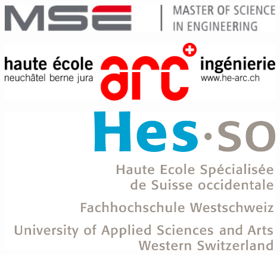 \begin{titlepage}
\fontsize{5cm}{10}%
\selectfont

\begin{flushright}
\begin{minipage}{0.33\textwidth}
\begin{flushleft}
\includegraphics[width=0.9\textwidth]{./images/logos/mse_logo.jpg}
\end{flushleft}
\vspace{1.3cm}
\end{minipage}
\begin{minipage}{0.33\textwidth}
\begin{center}
\includegraphics[width=0.9\textwidth]{./images/logos/he-arc-logo.png}
\end{center}
\vspace{1.3cm}
\end{minipage}%
\begin{minipage}{0.33\textwidth}
\begin{flushright}
\includegraphics[width=0.9\textwidth]{./images/logos/hes-so-logo.jpg}
\end{flushright}
\end{minipage}
\begin{flushleft}
\footnotesize
\vspace{-1cm}
\end{flushleft}
~\\[0.5cm]


\end{flushright}
\end{titlepage}
